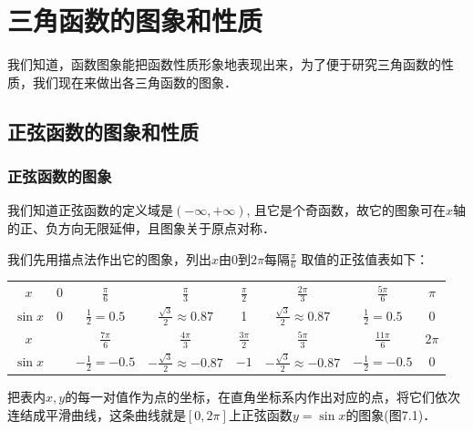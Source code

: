 \chapter{三角函数的图象和性质}
我们知道，函数图象能把函数性质形象地表现出来，为了便于研究三角函数的性质，我们现在来做出各三角函数的图象．
\section{正弦函数的图象和性质}
\subsection{正弦函数的图象}

我们知道正弦函数的定义域是$(-\infty, +\infty)$, 且它是个奇函数，故它的图象可在$x$轴的正、负方向无限延伸，且图象关于原点对称．

我们先用描点法作出它的图象，列出$x$由0到$2\pi$每隔$\frac{\pi}{6}$
取值的正弦值表如下：

\begin{center}
\begin{tabular}{c|ccccccc}
    \hline
$x$ & 0& $\frac{\pi}{6}$& $\frac{\pi}{3}$& $\frac{\pi}{2}$& $\frac{2\pi}{3}$& $\frac{5\pi}{6}$& $\pi$\\
$\sin x$ & 0  & $\frac{1}{2}=0.5$  & $\frac{\sqrt{3}}{2}\approx 0.87$  & 1  & $\frac{\sqrt{3}}{2}\approx 0.87$  & $\frac{1}{2}=0.5$ & 0\\
\hline
$x$ && $\frac{7\pi}{6}$& $\frac{4\pi}{3}$& $\frac{3\pi}{2}$& $\frac{5\pi}{3}$& $\frac{11\pi}{6}$&$2\pi$\\
$\sin x$ && $-\frac{1}{2}=-0.5$  & $-\frac{\sqrt{3}}{2}\approx -0.87$  & $-1$  & $-\frac{\sqrt{3}}{2}\approx -0.87$  & $-\frac{1}{2}=-0.5$  & 0\\
\hline
\end{tabular}
\end{center}

把表内$x,y$的每一对值作为点的坐标，在直角坐标系内作出对应的点，将它们依次连结成平滑曲线，这条曲线就是$[0, 2\pi]$上正弦函数$y=\sin x$的图象(图7.1)．

